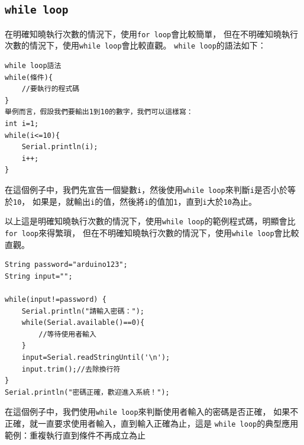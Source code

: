 \documentclass[12pt,a4paper]{article}
\begin{document}
\newpage
\subsection{\texttt{while loop}}
在明確知曉執行次數的情況下，使用\texttt{for loop}會比較簡單，
但在不明確知曉執行次數的情況下，使用\texttt{while loop}會比較直觀。
\texttt{while loop}的語法如下：
\begin{lstlisting}
while loop語法
while(條件){
    //要執行的程式碼
}
舉例而言，假設我們要輸出1到10的數字，我們可以這樣寫：
int i=1;
while(i<=10){
    Serial.println(i);
    i++;
}

\end{lstlisting}
在這個例子中，我們先宣告一個變數\texttt{i}，然後使用\texttt{while loop}來判斷\texttt{i}是否小於等於\texttt{10}，
如果是，就輸出\texttt{i}的值，然後將\texttt{i}的值加\texttt{1}，直到\texttt{i}大於\texttt{10}為止。


以上這是明確知曉執行次數的情況下，使用\texttt{while loop}的範例程式碼，明顯會比\texttt{for loop}來得繁瑣，
但在不明確知曉執行次數的情況下，使用\texttt{while loop}會比較直觀。
\begin{lstlisting}
String password="arduino123";
String input="";

while(input!=password) {
    Serial.println("請輸入密碼：");
    while(Serial.available()==0){
        //等待使用者輸入
    }
    input=Serial.readStringUntil('\n');
    input.trim();//去除換行符
}
Serial.println("密碼正確，歡迎進入系統！");
\end{lstlisting}
在這個例子中，我們使用\texttt{while loop}來判斷使用者輸入的密碼是否正確，
如果不正確，就一直要求使用者輸入，直到輸入正確為止，這是 \texttt{while loop}的典型應用範例：重複執行直到條件不再成立為止
\end{document}
